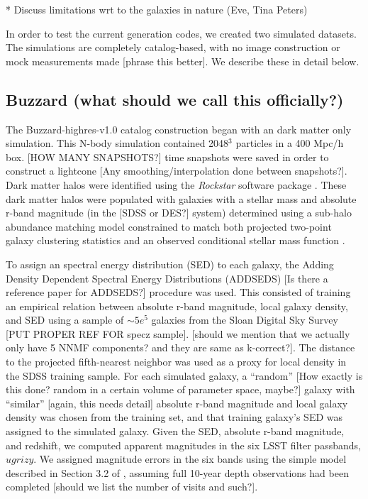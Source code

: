 \documentclass[usenatbib]{mn2e}
\begin{document}
* Discuss limitations wrt to the galaxies in nature (Eve, Tina Peters)

In order to test the current generation codes, we created two simulated datasets.  The simulations are completely catalog-based, with no image construction or mock measurements made [phrase this better].  We describe these in detail below.  

\subsection{Buzzard (what should we call this officially?)}\label{buzzard}

   The Buzzard-highres-v1.0 catalog construction began with an dark matter only simulation.  This N-body simulation contained 2048$^3$ particles in a 400 Mpc/h box.  [HOW MANY SNAPSHOTS?] time snapshots were saved in order to construct a lightcone [Any smoothing/interpolation done between snapshots?].  Dark matter halos were identified using the {\it Rockstar} software package \citep[]{Behroozi:13}.  These dark matter halos were populated with galaxies with a stellar mass and  absolute r-band magnitude (in the [SDSS or DES?] system) determined using a sub-halo abundance matching model constrained to match both projected two-point galaxy clustering statistics and an observed conditional stellar mass function \citep[]{Reddick:13}. 

To assign an spectral energy distribution (SED) to each galaxy, the Adding Density Dependent Spectral Energy Distributions (ADDSEDS) [Is there a reference paper for ADDSEDS?] procedure was used.  This consisted of training an empirical relation between absolute r-band magnitude, local galaxy density, and SED using a sample of $\sim 5e^{5}$ galaxies from the Sloan Digital Sky Survey [PUT PROPER REF FOR specz sample]. [should we mention that we actually only have 5 NNMF components? and they are same as k-correct?].  The distance to the projected fifth-nearest neighbor was used as a proxy for local density in the SDSS training sample.  For each simulated galaxy, a ``random'' [How exactly is this done? random in a certain volume of parameter space, maybe?] galaxy with ``similar'' [again, this needs detail] absolute r-band magnitude and local galaxy density was chosen from the training set, and that training galaxy's SED was assigned to the simulated galaxy.  Given the SED, absolute r-band magnitude, and redshift, we computed apparent magnitudes in the six LSST filter passbands, $ugrizy$.  We assigned magnitude errors in the six bands using the simple model described in Section 3.2 of \citet[]{Ivezic:08}, assuming full 10-year depth observations had been completed [should we list the number of visits and such?].
\end{document}
